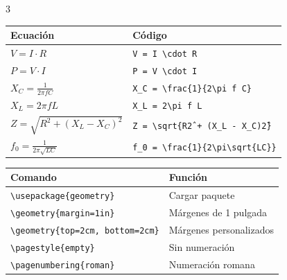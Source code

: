 \documentclass[10pt,landscape]{article}
\newcommand{\comando}[1]{\texttt{\textcolor{azulprofundo}{#1}}}
\begin{document}
\begin{multicols}{3}
\begin{tabular}{@{}ll@{}}
    \toprule
    \textbf{Ecuación} & \textbf{Código} \\
    \midrule
    $V = I \cdot R$ & \comando{V = I \textbackslash cdot R} \\
    $P = V \cdot I$ & \comando{P = V \textbackslash cdot I} \\
    $X_C = \frac{1}{2\pi f C}$ & \comando{X\_C = \textbackslash frac\{1\}\{2\textbackslash pi f C\}} \\
    $X_L = 2\pi f L$ & \comando{X\_L = 2\textbackslash pi f L} \\
    $Z = \sqrt{R^2 + (X_L - X_C)^2}$ & \comando{Z = \textbackslash sqrt\{R\^2 + (X\_L - X\_C)\^2\}} \\
    $f_0 = \frac{1}{2\pi\sqrt{LC}}$ & \comando{f\_0 = \textbackslash frac\{1\}\{2\textbackslash pi\textbackslash sqrt\{LC\}\}} \\
    \bottomrule
\end{tabular}

\vspace{0.5cm}

\tcbox[colback=grisclaro, colframe=azulprofundo, arc=3pt, boxsep=2pt, left=2pt, right=2pt, top=2pt, bottom=2pt]{
    \textbf{\textcolor{azulprofundo}{📏 CONFIGURACIÓN DE PÁGINA}}
}
\vspace{0.3cm}

\begin{tabular}{@{}ll@{}}
    \toprule
    \textbf{Comando} & \textbf{Función} \\
    \midrule
    \comando{\textbackslash usepackage\{geometry\}} & Cargar paquete \\
    \comando{\textbackslash geometry\{margin=1in\}} & Márgenes de 1 pulgada \\
    \comando{\textbackslash geometry\{top=2cm, bottom=2cm\}} & Márgenes personalizados \\
    \comando{\textbackslash pagestyle\{empty\}} & Sin numeración \\
    \comando{\textbackslash pagenumbering\{roman\}} & Numeración romana \\
    \bottomrule
\end{tabular}

\vspace{0.5cm}

\tcbox[colback=grisclaro, colframe=azulprofundo, arc=3pt, boxsep=2pt, left=2pt, right=2pt, top=2pt, bottom=2pt]{
    \textbf{\textcolor{azulprofundo}{📦 PAQUETES ESENCIALES}}
}
\vspace{0.3cm}


\end{multicols}
\end{document}
